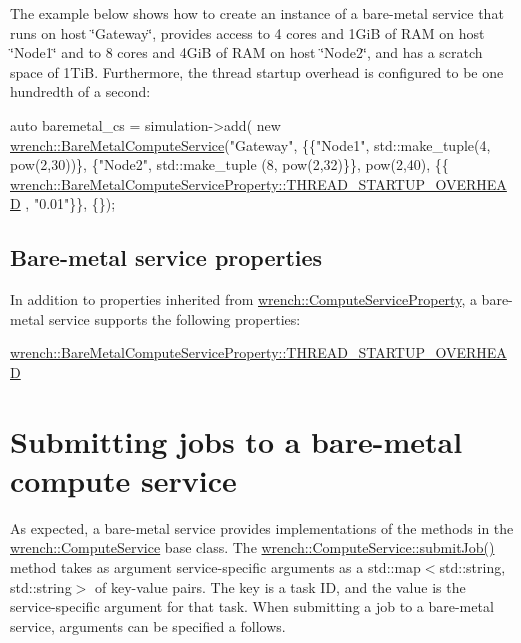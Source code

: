 The example below shows how to create an instance of a bare-\/metal service that runs on host \char`\"{}\+Gateway\char`\"{}, provides access to 4 cores and 1\+GiB of R\+AM on host \char`\"{}\+Node1\char`\"{} and to 8 cores and 4\+GiB of R\+AM on host \char`\"{}\+Node2\char`\"{}, and has a scratch space of 1\+TiB. Furthermore, the thread startup overhead is configured to be one hundredth of a second\+:


\begin{DoxyCode}
\textcolor{keyword}{auto} baremetal\_cs = simulation->add(
          \textcolor{keyword}{new} \hyperlink{classwrench_1_1_bare_metal_compute_service}{wrench::BareMetalComputeService}(\textcolor{stringliteral}{"Gateway"}, 
                                       \{\{\textcolor{stringliteral}{"Node1"}, std::make\_tuple(4, pow(2,30))\}, \{\textcolor{stringliteral}{"Node2"}, std::make\_tuple
      (8, pow(2,32)\}\},
                                       pow(2,40),
                                       \{\{
      \hyperlink{classwrench_1_1_bare_metal_compute_service_property_a63dfaa7ebb4dc18d236c58384f14dd25}{wrench::BareMetalComputeServiceProperty::THREAD\_STARTUP\_OVERHEAD}
      , \textcolor{stringliteral}{"0.01"}\}\}, 
                                       \{\});
\end{DoxyCode}
\hypertarget{guide-batch_guide-baremetal-creating-properties}{}\subsection{Bare-\/metal service properties}\label{guide-batch_guide-baremetal-creating-properties}
In addition to properties inherited from {\ttfamily \hyperlink{classwrench_1_1_compute_service_property}{wrench\+::\+Compute\+Service\+Property}}, a bare-\/metal service supports the following properties\+:


\begin{DoxyItemize}
\item {\ttfamily \hyperlink{classwrench_1_1_bare_metal_compute_service_property_a63dfaa7ebb4dc18d236c58384f14dd25}{wrench\+::\+Bare\+Metal\+Compute\+Service\+Property\+::\+T\+H\+R\+E\+A\+D\+\_\+\+S\+T\+A\+R\+T\+U\+P\+\_\+\+O\+V\+E\+R\+H\+E\+AD}}
\end{DoxyItemize}\hypertarget{guide-baremetal_guide-baremetal-using}{}\section{Submitting jobs to a bare-\/metal compute service}\label{guide-baremetal_guide-baremetal-using}
As expected, a bare-\/metal service provides implementations of the methods in the {\ttfamily \hyperlink{classwrench_1_1_compute_service}{wrench\+::\+Compute\+Service}} base class. The {\ttfamily \hyperlink{classwrench_1_1_compute_service_abc9e51234c29965341727f07b446ff0c}{wrench\+::\+Compute\+Service\+::submit\+Job()}} method takes as argument service-\/specific arguments as a {\ttfamily std\+::map$<$std\+::string, std\+::string$>$} of key-\/value pairs. The key is a task ID, and the value is the service-\/specific argument for that task. When submitting a job to a bare-\/metal service, arguments can be specified a follows.

